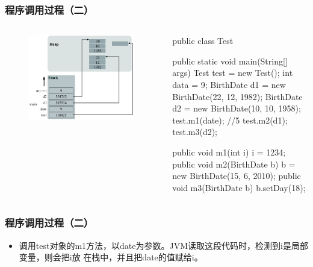 \documentclass[hyperref={pdfpagelabels=false},compress,table]{beamer} %
\begin{document}
\begin{frame}[fragile] %
\frametitle{程序调用过程（二）}

\begin{columns}
\begin{figure}
\centering
\includegraphics[width=0.98\textwidth]{fig02.pdf}
\end{figure}

\begin{javaCode}\small
public class Test {
  public static void main(String[] args) {
    Test test = new Test(); 
    int data = 9; 
    BirthDate d1 = new BirthDate(22, 12, 1982); 
    BirthDate d2 = new BirthDate(10, 10, 1958); 
    test.m1(date); //5
    test.m2(d1);
    test.m3(d2);
  }

  public void m1(int i) {
    i = 1234;
  }
  public void m2(BirthDate b) {
    b = new BirthDate(15, 6, 2010);
  }
  public void m3(BirthDate b) {
    b.setDay(18);
  }
}
\end{javaCode}
\end{columns}
\end{frame}

\begin{frame}[fragile] %
\frametitle{程序调用过程（二）}
\begin{itemize}
\item 调用test对象的m1方法，以date为参数。JVM读取这段代码时，检测到i是局部变量，则会把i放
  在栈中，并且把date的值赋给i。
\end{itemize}
\end{frame}
\end{document}
